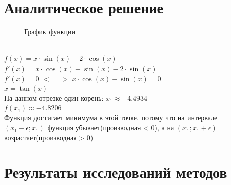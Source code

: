 \documentclass[12pt, a4paper]{article}
\begin{document}
    \section{Аналитическое решение}\label{sec:аналитическое-решение}
    \begin{figure}[h]
        \caption{График функции}
        \label{fig:image}
    \end{figure}
    \\
    \Large{$f(x) = x \cdot \sin(x) + 2 \cdot \cos(x)$}
    \\
    \Large{$f'(x) = x \cdot \cos(x)  + \sin(x) - 2 \cdot \sin(x)$}
    \\
    \Large{$f'(x) = 0$}
    \qquad
    \Large{$<=>$}
    \qquad
    \Large{$x \cdot \cos(x) - \sin(x) = 0$}
    \\
    \Large{$x = \tan(x)$}
    \\
    \Large{На данном отрезке один корень: $x_1 \approx -4.4934$}
    \\
    \Large{$f(x_1) \approx -4.8206$}
    \\
    \Large{Функция достигает минимума в этой точке. потому что на интервале $(x_1 - \epsilon ; x_1)$ функция убывает(производная < 0), а на $(x_1; x_1 + \epsilon )$ возрастает(производная > 0)}
    \newpage


    \section{Результаты исследований методов}\label{sec:результаты-исследований-методов}
    
\end{document}
